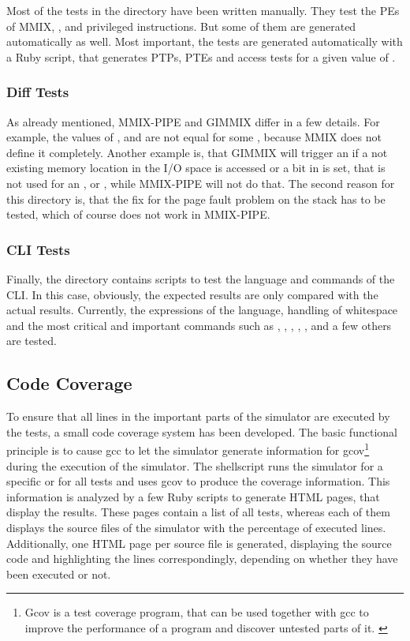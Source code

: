 Most of the tests in the  directory have been written manually. They test the PEs of MMIX, ,  and privileged instructions. But some of them are generated automatically as well. Most important, the  tests are generated automatically with a \gls{Ruby} script, that generates PTPs, PTEs and access tests for a given value of .

\subsubsection{Diff Tests}

As already mentioned, MMIX-PIPE and GIMMIX differ in a few details. For example, the values of ,  and  are not equal for some , because MMIX does not define it completely. Another example is, that GIMMIX will trigger an  if a not existing memory location in the I/O space is accessed or a bit in  is set, that is not used for an ,  or , while MMIX-PIPE will not do that. The second reason for this directory is, that the fix for the page fault problem on the stack has to be tested, which of course does not work in MMIX-PIPE.

\subsubsection{CLI Tests}

Finally, the directory  contains scripts to test the language and commands of the CLI. In this case, obviously, the expected results are only compared with the actual results. Currently, the expressions of the language, handling of whitespace and the most critical and important commands such as , , , , ,  and a few others are tested.

\subsection{Code Coverage}

To ensure that all lines in the important parts of the simulator are executed by the tests, a small code coverage system has been developed. The basic functional principle is to cause \gls{gcc} to let the simulator generate information for gcov\footnote{Gcov is a test coverage program, that can be used together with \gls{gcc} to improve the performance of a program and discover untested parts of it. \citep{gcov}} during the execution of the simulator. The shellscript  runs the simulator for a specific or for all tests and uses gcov to produce the coverage information. This information is analyzed by a few \gls{Ruby} scripts to generate HTML pages, that display the results. These pages contain a list of all tests, whereas each of them displays the source files of the simulator with the percentage of executed lines. Additionally, one HTML page per source file is generated, displaying the source code and highlighting the lines correspondingly, depending on whether they have been executed or not.

